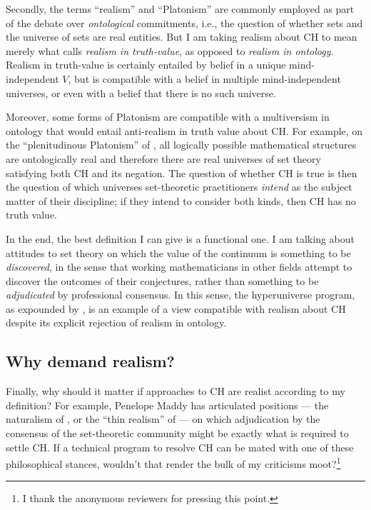 \documentclass[letterpaper,12pt]{article}
\begin{document}
Secondly, the terms ``realism'' and ``Platonism'' are commonly employed as part of the debate over \emph{ontological} commitments, i.e., the question of whether sets and the universe of sets are real entities. But I am taking realism about CH to mean merely what \cite{Shapiro2000-SHATAM} calls \emph{realism in truth-value}, as opposed to \emph{realism in ontology}. Realism in truth-value is certainly entailed by belief in a unique mind-independent $V$, but is compatible with a belief in multiple mind-independent universes, or even with a belief that there is no such universe.

Moreover, some forms of Platonism are compatible with a multiversism in ontology that would entail anti-realism in truth value about CH. For example, on the ``plenitudinous Platonism'' of \cite{Balaguer1998-BALPAA-3}, all logically possible mathematical structures are ontologically real and therefore there are real universes of set theory satisfying both CH and its negation. The question of whether CH is true is then the question of which universes set-theoretic practitioners \emph{intend} as the subject matter of their discipline; if they intend to consider both kinds, then CH has no truth value.

In the end, the best definition I can give is a functional one. I am talking about attitudes to set theory on which the value of the continuum is something to be \emph{discovered}, in the sense that working mathematicians in other fields attempt to discover the outcomes of their conjectures, rather than something to be \emph{adjudicated} by professional consensus. In this sense, the hyperuniverse program, as expounded by \cite{arrigoni2013hyperuniverse}, is an example of a view compatible with realism about CH despite its explicit rejection of realism in ontology.



\subsection{Why demand realism?}
Finally, why should it matter if approaches to CH are realist according to my definition? For example, Penelope Maddy has articulated positions --- the naturalism of \citeyearpar{Maddy1997-MADNIM}, or the ``thin realism'' of \citeyearpar{Maddy2011-MADDTA} --- on which adjudication by the consensus of the set-theoretic community might be exactly what is required to settle CH. If a technical program to resolve CH can be mated with one of these philosophical stances, wouldn't that render the bulk of my criticisms moot?\footnote{I thank the anonymous reviewers for pressing this point.}
\end{document}
